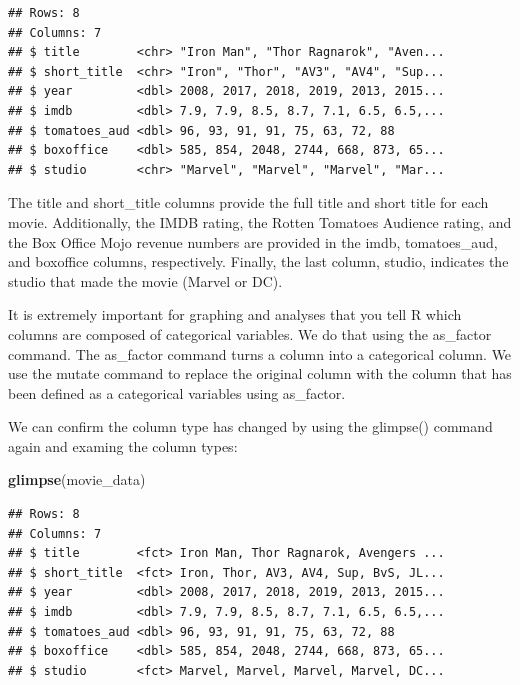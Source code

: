 \documentclass[
]{krantz}
\makeatletter
\newenvironment{Shaded}{\begin{snugshade}}{\end{snugshade}}
\newcommand{\DataTypeTok}[1]{\textcolor[rgb]{0.27,0.27,0.27}{#1}}
\newcommand{\KeywordTok}[1]{\textcolor[rgb]{0.27,0.27,0.27}{\textbf{#1}}}
\newcommand{\NormalTok}[1]{#1}
\newcommand{\OperatorTok}[1]{\textcolor[rgb]{0.43,0.43,0.43}{\textbf{#1}}}
\newcommand{\StringTok}[1]{\textcolor[rgb]{0.5,0.5,0.5}{#1}}
\newenvironment{kframe}{%
\medskip{}
\setlength{\fboxsep}{.8em}
 \def\at@end@of@kframe{}%
 \ifinner\ifhmode%
  \def\at@end@of@kframe{\end{minipage}}%
  \begin{minipage}{\columnwidth}%
 \fi\fi%
 \def\FrameCommand##1{\hskip\@totalleftmargin \hskip-\fboxsep
 \colorbox{shadecolor}{##1}\hskip-\fboxsep
     \hskip-\linewidth \hskip-\@totalleftmargin \hskip\columnwidth}%
 \MakeFramed {\advance\hsize-\width
   \@totalleftmargin\z@ \linewidth\hsize
   \@setminipage}}%
 {\par\unskip\endMakeFramed%
 \at@end@of@kframe}
\renewenvironment{Shaded}{\begin{kframe}}{\end{kframe}}
\makeatother
\begin{document}
\begin{verbatim}
## Rows: 8
## Columns: 7
## $ title        <chr> "Iron Man", "Thor Ragnarok", "Aven...
## $ short_title  <chr> "Iron", "Thor", "AV3", "AV4", "Sup...
## $ year         <dbl> 2008, 2017, 2018, 2019, 2013, 2015...
## $ imdb         <dbl> 7.9, 7.9, 8.5, 8.7, 7.1, 6.5, 6.5,...
## $ tomatoes_aud <dbl> 96, 93, 91, 91, 75, 63, 72, 88
## $ boxoffice    <dbl> 585, 854, 2048, 2744, 668, 873, 65...
## $ studio       <chr> "Marvel", "Marvel", "Marvel", "Mar...
\end{verbatim}

The title and short\_title columns provide the full title and short title for each movie. Additionally, the IMDB rating, the Rotten Tomatoes Audience rating, and the Box Office Mojo revenue numbers are provided in the imdb, tomatoes\_aud, and boxoffice columns, respectively. Finally, the last column, studio, indicates the studio that made the movie (Marvel or DC).

It is extremely important for graphing and analyses that you tell R which columns are composed of categorical variables. We do that using the as\_factor command. The as\_factor command turns a column into a categorical column. We use the mutate command to replace the original column with the column that has been defined as a categorical variables using as\_factor.

\begin{Shaded}
\end{Shaded}

We can confirm the column type has changed by using the glimpse() command again and examing the column types:

\begin{Shaded}
\begin{Highlighting}[]
\KeywordTok{glimpse}\NormalTok{(movie_data)}
\end{Highlighting}
\end{Shaded}

\begin{verbatim}
## Rows: 8
## Columns: 7
## $ title        <fct> Iron Man, Thor Ragnarok, Avengers ...
## $ short_title  <fct> Iron, Thor, AV3, AV4, Sup, BvS, JL...
## $ year         <dbl> 2008, 2017, 2018, 2019, 2013, 2015...
## $ imdb         <dbl> 7.9, 7.9, 8.5, 8.7, 7.1, 6.5, 6.5,...
## $ tomatoes_aud <dbl> 96, 93, 91, 91, 75, 63, 72, 88
## $ boxoffice    <dbl> 585, 854, 2048, 2744, 668, 873, 65...
## $ studio       <fct> Marvel, Marvel, Marvel, Marvel, DC...
\end{verbatim}
\end{document}
